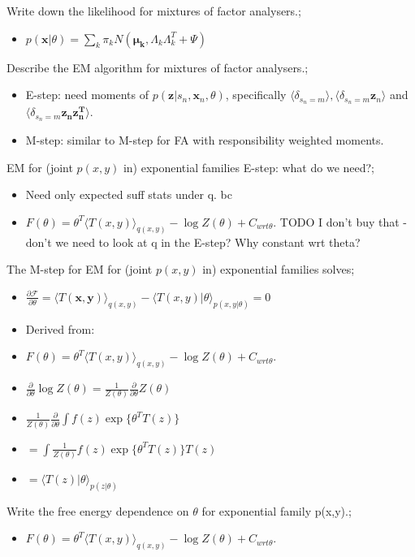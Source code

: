 \documentclass{article}
\begin{document}
Write down the likelihood for mixtures of factor analysers.; \begin{itemize} \item $p(\mathbf{x}|\theta) = \sum_k \pi_k N(\mathbf{\mu_k}, \Lambda_k\Lambda_k^T + \Psi)$ \end{itemize}

Describe the EM algorithm for mixtures of factor analysers.; \begin{itemize} \item E-step: need moments of $p(\mathbf{z}|s_n, \mathbf{x}_n, \theta)$, specifically $\langle \delta_{s_n=m}\rangle, \langle\delta_{s_n=m}\mathbf{z}_n\rangle$ and $\langle \delta_{s_n=m}\mathbf{z_nz_n^T}\rangle$.  \item M-step: similar to M-step for FA with responsibility weighted moments.  \end{itemize} 

EM for (joint $p(x,y)$ in) exponential families E-step: what do we need?; \begin{itemize} \item Need only expected suff stats under q. bc \item $F(\theta) = \theta^T\langle T(x, y) \rangle_{q(x, y)} - \log Z(\theta) + C_{wrt \theta}$. TODO I don't buy that - don't we need to look at q in the E-step? Why constant wrt theta?\end{itemize}

The M-step for EM for (joint $p(x,y)$ in) exponential families solves; \begin{itemize} \item $\frac{\partial \mathcal{F}}{\partial \theta}= \langle T(\mathbf{x, y})\rangle_{q(x, y)} - \langle T(x, y)|\theta \rangle_{p(x, y|\theta)} = 0$ \item Derived from: \item $F(\theta) = \theta^T\langle T(x, y) \rangle_{q(x, y)} - \log Z(\theta) + C_{wrt \theta}$. \item $\frac{\partial}{\partial \theta}\log Z(\theta) = \frac{1}{Z(\theta)}\frac{\partial}{\partial\theta}Z(\theta)$ \item $\frac{1}{Z(\theta)}\frac{\partial}{\partial\theta}\int f(z)\exp\{\theta^TT(z)\}$ \item $=\int \frac{1}{Z(\theta)}f(z)\exp\{\theta^TT(z)\}T(z)$ \item $=\langle T(z)|\theta\rangle_{p(z|\theta)}$ \end{itemize}

Write the free energy dependence on $\theta$ for exponential family p(x,y).; \begin{itemize} \item $F(\theta) = \theta^T\langle T(x, y) \rangle_{q(x, y)} - \log Z(\theta) + C_{wrt \theta}$. \end{itemize}
\end{document}
